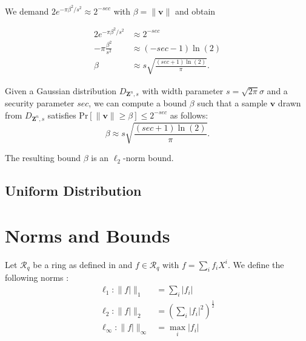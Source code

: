 We demand $2 e^{-\pi \beta^2/s^2} \approx 2^{-sec}$ with $\beta = \|\mathbf{v}\|$  and obtain

\begin{align*}
    2 e^{-\pi \beta^2/s^2}   & \approx 2^{-sec}                               \\
    -\pi \frac{\beta^2}{s^2} & \approx (-sec - 1)\ln (2)                      \\
    \beta                    & \approx s \sqrt{\frac{(sec + 1) \ln(2)}{\pi}}.
\end{align*}

\begin{theorem}
    Given a Gaussian distribution $D_{\mathbf{Z}^n, s}$ with width parameter $s  = \sqrt{2 \pi} \sigma$ and a security parameter $sec$, we can compute a bound $\beta$ such that a sample $\mathbf{v}$ drawn from $D_{\mathbf{Z}^n, s}$ satisfies $\text{Pr}\left[ \|\mathbf{v}\| \geq \beta \right] \leq 2^{-sec}$ as follows:
    \begin{equation}
        \beta  \approx s \sqrt{\frac{(sec + 1) \ln(2)}{\pi}}.
    \end{equation}
\end{theorem}

The resulting bound $\beta$ is an $\ell_2$-norm bound. %


\subsection{Uniform Distribution}



\section{Norms and Bounds} %
Let $\mathcal{R}_q$ be a ring as defined in \cite{BDLOP18} and $f \in \mathcal{R}_q$ with $f = \sum_i f_i X^i$. We define the following norms \cite{BDLOP18}:
\begin{align}
    \ell_1 : \| f| \|_1           & = \sum_i |f_i|                               \\
    \ell_2 : \| f| \|_2           & = \left(\sum_i |f_i|^2\right) ^{\frac{1}{2}} \\
    \ell_\infty : \| f| \|_\infty & = \max_i |f_i|
\end{align}

